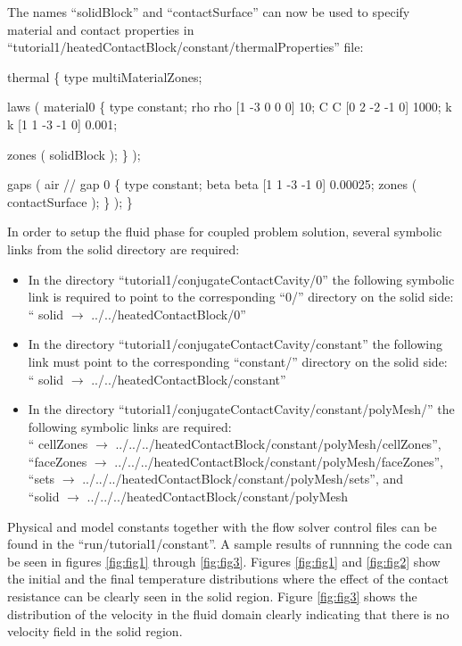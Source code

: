 The names ``solidBlock'' and ``contactSurface'' can now be used to
specify material and contact properties in
``tutorial1/heatedContactBlock/constant/thermalProperties'' file:

\begin{verbQuoteSmall}
thermal
\{
    type                    multiMaterialZones;

    laws
    (
        material0
        \{
            type            constant;
            rho             rho [1 -3 0 0 0] 10;
            C               C [0 2 -2 -1 0] 1000;
            k               k [1 1 -3 -1  0] 0.001;

            zones           ( solidBlock );
        \}
    );

    gaps
    (
        air // gap 0
        \{
            type            constant;
            beta            beta [1 1 -3 -1 0] 0.00025;
            zones           ( contactSurface );
        \}
    );
\}
\end{verbQuoteSmall}

In order to setup the fluid phase for coupled problem solution,
several symbolic links from the solid directory are required:

\begin{itemize}
\item In the directory ``tutorial1/conjugateContactCavity/0'' the
  following symbolic link is required to point to the corresponding
  ``0/'' directory on the solid side: `` solid $\rightarrow$
  ../../heatedContactBlock/0''
\item In the directory ``tutorial1/conjugateContactCavity/constant''
  the following link must point to the corresponding ``constant/''
  directory on the solid side: `` solid $\rightarrow$
  ../../heatedContactBlock/constant''
\item In the directory
  ``tutorial1/conjugateContactCavity/constant/polyMesh/'' the
  following symbolic links are required: \\ `` cellZones $\rightarrow$
  ../../../heatedContactBlock/constant/polyMesh/cellZones'',
  \\ ``faceZones $\rightarrow$
  ../../../heatedContactBlock/constant/polyMesh/faceZones'', \\ ``sets
  $\rightarrow$ ../../../heatedContactBlock/constant/polyMesh/sets'',
  and\\ ``solid $\rightarrow$
  ../../../heatedContactBlock/constant/polyMesh
\end{itemize}

Physical and model constants together with the flow solver control
files can be found in the ``run/tutorial1/constant''. A sample results
of runnning the code can be seen in figures \ref{fig:fig1}
through \ref{fig:fig3}. Figures \ref{fig:fig1} and \ref{fig:fig2} show
the initial and the final temperature distributions where the effect
of the contact resistance can be clearly seen in the solid
region. Figure \ref{fig:fig3} shows the distribution of the velocity
in the fluid domain clearly indicating that there is no velocity field
in the solid region.

